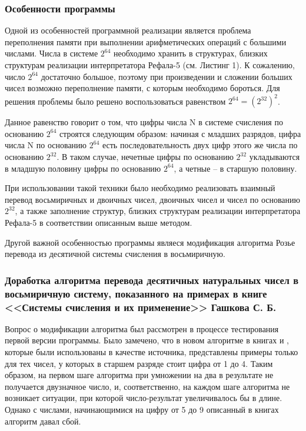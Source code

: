 \documentclass[14pt, russian]{scrartcl}
\begin{document}
\subsubsection{Особенности программы}
Одной из особенностей программной реализации является проблема переполнения памяти при выполнении арифметических операций с большими числами. Числа в системе $2^{64}$ необходимо хранить в структурах, близких структурам реализации интерпретатора Рефала-5 (см. Листинг 1). К сожалению, число $2^{64}$ достаточно большое, поэтому при произведении и сложении больших чисел возможно переполнение памяти, с которым необходимо бороться. Для решения проблемы было решено воспользоваться равенством $2^{64} = (2^{32})^2$. 

Данное равенство говорит о том, что цифры числа N в системе счисления по основанию $2^{64}$ строятся следующим образом: начиная с младших разрядов, цифра числа N по основанию $2^{64}$ есть последовательность двух цифр этого же числа по основанию $2^{32}$. В таком случае, нечетные цифры по основанию $2^{32}$ укладываются в младшую половину цифры по основанию $2^{64}$, а четные -- в старшую половину.

При использовании такой техники было необходимо реализовать взаимный перевод восьмиричных и двоичных чисел, двоичных чисел и чисел по основанию $2^{32}$, а также заполнение структур, близких структурам реализации интерпретатора Рефала-5 в соответствии описанным выше методом.

Другой важной особенностью программы являеся модификация алгоритма Розье перевода из десятичной системы счисления в восьмиричную. 

\subsubsection{Доработка алгоритма перевода десятичных натуральных чисел в восьмиричную систему, показанного на примерах в книге <<Системы счисления и их применение>> Гашкова С. Б.}
Вопрос о модификации алгоритма был рассмотрен в процессе тестирования первой версии программы. Было замечено, что в новом алгоритме в книгах \cite{CountSystems} и \cite{ComputerArithm}, которые были использованы в качестве источника, представлены примеры только для тех чисел, у которых в старшем разряде стоит цифра от 1 до 4. Таким образом, на первом шаге алгоритма при умножении на два в результате не получается двузначное число, и, соответственно, на каждом шаге алгоритма не возникает ситуации, при которой число-результат увеличивалось бы в длине. Однако с числами, начинающимися на цифру от 5 до 9 описанный в книгах алгоритм давал сбой.
\end{document}
